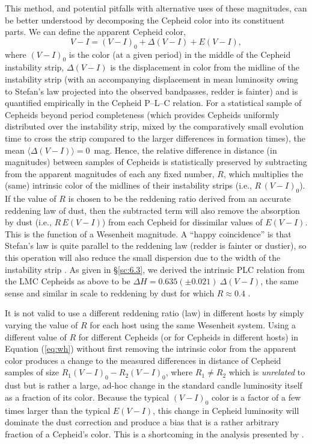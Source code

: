 \documentclass[12pt]{aastex631}
\newcommand{\bq}{\begin{equation}}
\newcommand{\eq}{\end{equation}}
\begin{document}
\begin{appendices}
This method, and potential pitfalls with alternative uses of these magnitudes, can be better understood by decomposing the Cepheid color into its constituent parts.  We can define the apparent Cepheid color,
\bq V\!-\!I=(V\!-\!I)_0 + \Delta(V\!-\!I) + E({V\!-\!I}) , \eq 
where $(V\!-\!I)_0 $ is the color (at a given period) in the middle of the Cepheid instability strip,  $\Delta(V\!-\!I)$ is the displacement in color from the midline of the instability strip (with an accompanying displacement in mean luminosity owing to Stefan's law projected into the observed bandpasses, redder is fainter) and is quantified empirically in the Cepheid P--L--C relation.  For a statistical sample of Cepheids beyond period completeness (which provides Cepheids uniformly distributed over the instability strip, mixed by the comparatively small evolution time to cross the strip compared to the larger differences in formation times), the mean $\langle \Delta (V\!-\!I)\rangle =0$~mag.  Hence, the relative difference in distance (in magnitudes) between samples of Cepheids is statistically preserved by subtracting from the apparent magnitudes of each any fixed number, $R$, which multiplies the (same) intrinsic color of the midlines of their instability strips (i.e., $R\,(V\!-\!I)_0$).  If the value of $R$ is chosen to be the reddening ratio derived from an accurate reddening law of dust, then the subtracted term will also remove the absorption by dust (i.e., $R\, E({V\!-\!I})$) from each Cepheid for dissimilar values of $E({V\!-\!I})$.  This is the function of a Wesenheit magnitude.  A ``happy coincidence'' is that Stefan's law is quite parallel to the reddening law (redder is fainter or dustier), so this operation will also reduce the small dispersion due to the width of the instability strip \citep{madore91}.  As given in \S\ref{sc:6.3}, we derived the intrinsic PLC relation from the LMC Cepheids as above to be $\Delta H=0.635 (\pm 0.021)\ \Delta(V\!-\!I)$, the same sense and similar in scale to reddening by dust for which $R \approx 0.4$ .

It is not valid to use a different reddening ratio (law) in different hosts by simply varying the value of $R$ for each host using the same Wesenheit system.  Using a different value of $R$ for different Cepheids (or for Cepheids in different hosts) in Equation (\ref{eq:wh}) without first removing the intrinsic color from the apparent color produces a change to the measured differences in distance of Cepheid samples of size $R_1(V\!-\!I)_0-R_2(V\!-\!I)_0$, where $R_1 \neq R_2$ which is {\it unrelated} to dust but is rather a large, ad-hoc change in the standard candle luminosity itself as a fraction of its color.  Because the typical $(V\!-\!I)_0$ color is a factor of a few times larger than the typical $E({V\!-\!I})$, this change in Cepheid luminosity will dominate the dust correction and produce a bias that is a rather arbitrary fraction of a Cepheid's color.  This is a shortcoming in the analysis presented by \citet{Mortsell:2021}.


\end{appendices}
\end{document}
